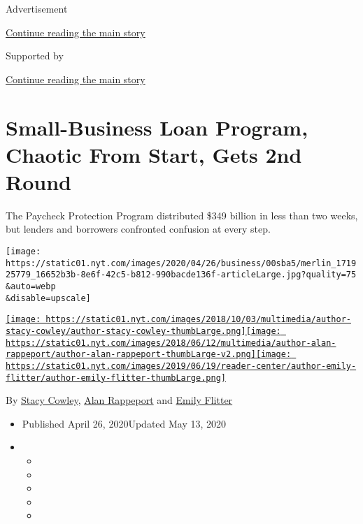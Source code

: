 Advertisement

\protect\hyperlink{after-top}{Continue reading the main story}

Supported by

\protect\hyperlink{after-sponsor}{Continue reading the main story}

\hypertarget{small-business-loan-program-chaotic-from-start-gets-2nd-round}{%
\section{Small-Business Loan Program, Chaotic From Start, Gets 2nd
Round}\label{small-business-loan-program-chaotic-from-start-gets-2nd-round}}

The Paycheck Protection Program distributed \$349 billion in less than
two weeks, but lenders and borrowers confronted confusion at every step.

\texttt{[image: https://static01.nyt.com/images/2020/04/26/business/00sba5/merlin\_171925779\_16652b3b-8e6f-42c5-b812-990bacde136f-articleLarge.jpg?quality=75\\\&auto=webp\\\&disable=upscale]}

\href{https://www.nytimes.com/by/stacy-cowley}{\texttt{[image: https://static01.nyt.com/images/2018/10/03/multimedia/author-stacy-cowley/author-stacy-cowley-thumbLarge.png]}}\href{https://www.nytimes.com/by/alan-rappeport}{\texttt{[image: https://static01.nyt.com/images/2018/06/12/multimedia/author-alan-rappeport/author-alan-rappeport-thumbLarge-v2.png]}}\href{https://www.nytimes.com/by/emily-flitter}{\texttt{[image: https://static01.nyt.com/images/2019/06/19/reader-center/author-emily-flitter/author-emily-flitter-thumbLarge.png]}}

By \href{https://www.nytimes.com/by/stacy-cowley}{Stacy Cowley},
\href{https://www.nytimes.com/by/alan-rappeport}{Alan Rappeport} and
\href{https://www.nytimes.com/by/emily-flitter}{Emily Flitter}

\begin{itemize}
\item
  Published April 26, 2020Updated May 13, 2020
\item
  \begin{itemize}
  \item
  \item
  \item
  \item
  \item
  \end{itemize}
\end{itemize}

